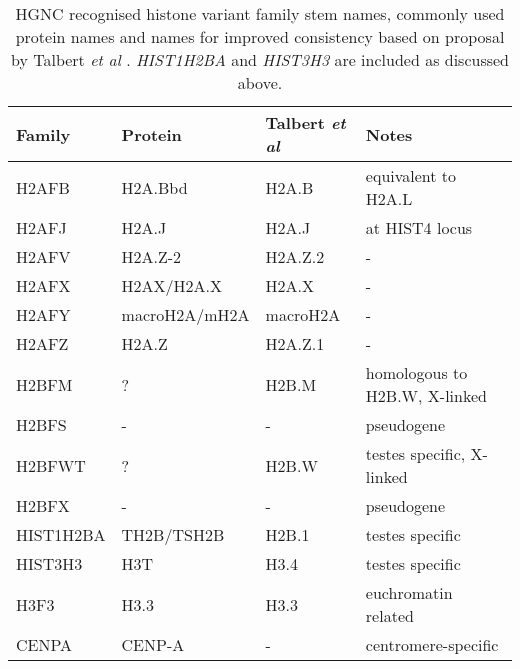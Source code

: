 \begin{table*}
	\caption{HGNC recognised histone variant family stem names, commonly used protein names 
	and names for improved consistency based on proposal by Talbert \textit{et al} \citep{Talbert2012}. 
	\textit{HIST1H2BA} and \textit{HIST3H3} are included as discussed above.}
	\label{tab:histone-variant-families}
	\centering
	\begin{tabular}{l l l l}
	\toprule
	Family & Protein & Talbert \textit{et al} & Notes \\
	\midrule
	H2AFB & H2A.Bbd & H2A.B & equivalent to H2A.L \\
	H2AFJ & H2A.J & H2A.J & at HIST4 locus \\
	H2AFV & H2A.Z-2 & H2A.Z.2 & - \\
	H2AFX & H2AX/H2A.X & H2A.X & - \\
	H2AFY & macroH2A/mH2A & macroH2A & - \\
	H2AFZ & H2A.Z & H2A.Z.1 & - \\
	H2BFM & ? & H2B.M & homologous to H2B.W, X-linked\\
	H2BFS & - & - & pseudogene \\
	H2BFWT & ? & H2B.W & testes specific, X-linked \\
	H2BFX & - & - & pseudogene \\
	HIST1H2BA & TH2B/TSH2B & H2B.1 & testes specific \\
	HIST3H3 & H3T & H3.4 & testes specific \\
	H3F3 & H3.3 & H3.3 & euchromatin related \\
	CENPA & CENP-A & - & centromere-specific \\
	\bottomrule
	\end{tabular}
\end{table*}